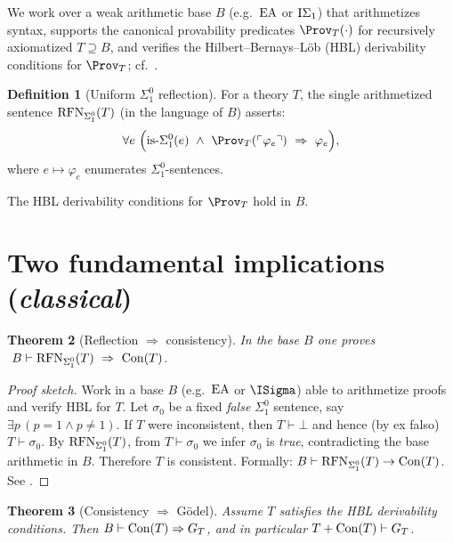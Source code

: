 \documentclass[11pt]{article}
\newtheorem{theorem}{Theorem}[section]
\theoremstyle{definition}
\newtheorem{definition}[theorem]{Definition}
\theoremstyle{remark}
\begin{document}
We work over a weak arithmetic base \(B\) (e.g.\ \(\mathrm{EA}\) or \(\mathrm{I}\Sigma_1\)) that arithmetizes syntax,
supports the canonical provability predicates \(\Prov_T(\cdot)\) for recursively axiomatized \(T\supseteq B\),
and verifies the Hilbert–Bernays–L\"ob (HBL) derivability conditions for \(\Prov_T\); cf.\ \cite{HajekPudlak}.

\begin{definition}[Uniform $\Sigma^0_1$ reflection]\label{V:def:RFN}
For a theory \(T\), the single arithmetized sentence \(\mathrm{RFN}_{\Sigma^0_1}(T)\) (in the language of \(B\)) asserts:
\[
\forall e\ \Big(\mathrm{is}\text{-}\Sigma^0_1(e)\ \wedge\ \Prov_T(\ulcorner \varphi_e\urcorner)\ \Rightarrow\ \varphi_e\Big),
\]
where \(e\mapsto \varphi_e\) enumerates \(\Sigma^0_1\)-sentences.
\end{definition}

\begin{assumption}\label{V:ass:HBL}
The HBL derivability conditions for \(\Prov_T\) hold in \(B\).
\end{assumption}

\section{Two fundamental implications (\emph{classical})}

\begin{theorem}[Reflection $\Rightarrow$ consistency]\label{V:thm:RFN-implies-Con}
In the base \(B\) one proves \(\ B\vdash \RFNSigOne(T)\ \Rightarrow\ \Con(T)\).
\end{theorem}

\begin{proof}[Proof sketch]
Work in a base \(B\) (e.g.\ \(\mathrm{EA}\) or \(\ISigma\)) able to arithmetize proofs and verify HBL for \(T\).
Let \(\sigma_0\) be a fixed \emph{false} \(\Sigma^0_1\) sentence, say \(\exists p\,(p=1\wedge p\neq 1)\).
If \(T\) were inconsistent, then \(T\vdash \bot\) and hence (by ex falso) \(T\vdash \sigma_0\).
By \(\mathrm{RFN}_{\Sigma^0_1}(T)\), from \(T\vdash \sigma_0\) we infer \(\sigma_0\) is \emph{true}, contradicting the
base arithmetic in \(B\). Therefore \(T\) is consistent. Formally: \(B\vdash \mathrm{RFN}_{\Sigma^0_1}(T)\to\mathrm{Con}(T)\).
See \cite[§I]{HajekPudlak}.
\end{proof}

\begin{theorem}[Consistency $\Rightarrow$ G\"odel]\label{V:thm:Con-implies-G}
Assume \(T\) satisfies the HBL derivability conditions. Then
\(B \vdash \mathrm{Con}(T) \Rightarrow G_T\), and in particular \(T+\mathrm{Con}(T)\vdash G_T\).
\end{theorem}
\end{document}

